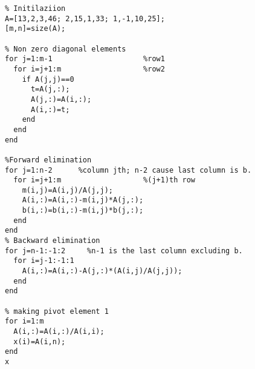 \begin{verbatim}
% Initilaziion
A=[13,2,3,46; 2,15,1,33; 1,-1,10,25];
[m,n]=size(A);

% Non zero diagonal elements
for j=1:m-1                     %row1
  for i=j+1:m                   %row2
    if A(j,j)==0
      t=A(j,:);
      A(j,:)=A(i,:);
      A(i,:)=t;
    end
  end
end

%Forward elimination
for j=1:n-2      %column jth; n-2 cause last column is b.
  for i=j+1:m                   %(j+1)th row
    m(i,j)=A(i,j)/A(j,j);
    A(i,:)=A(i,:)-m(i,j)*A(j,:);
    b(i,:)=b(i,:)-m(i,j)*b(j,:);
  end
end
% Backward elimination
for j=n-1:-1:2     %n-1 is the last column excluding b.
  for i=j-1:-1:1
    A(i,:)=A(i,:)-A(j,:)*(A(i,j)/A(j,j));
  end
end

% making pivot element 1
for i=1:m
  A(i,:)=A(i,:)/A(i,i);
  x(i)=A(i,n);
end
x
\end{verbatim}